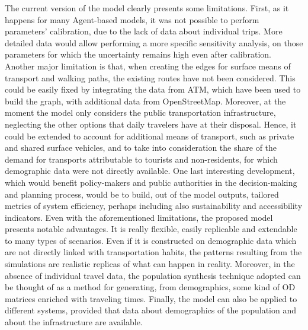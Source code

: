 The current version of the model clearly presents some limitations. First, as it happens for many Agent-based models, it was not possible to perform parameters' calibration, due to the lack of data about individual trips. More detailed data would allow performing a more specific sensitivity analysis, on those parameters for which the uncertainty remains high even after calibration. Another major limitation is that, when creating the edges for surface means of transport and walking paths, the existing routes have not been considered. This could be easily fixed by integrating the data from ATM, which have been used to build the graph, with additional data from OpenStreetMap. Moreover, at the moment the model only considers the public transportation infrastructure, neglecting the other options that daily travelers have at their disposal. Hence, it could be extended to account for additional means of transport, such as private and shared surface vehicles, and to take into consideration the share of the demand for transports attributable to tourists and non-residents, for which demographic data were not directly available. One last interesting development, which would benefit policy-makers and public authorities in the decision-making and planning process, would be to build, out of the model outputs, tailored metrics of system efficiency, perhaps including also sustainability and accessibility indicators.
Even with the aforementioned limitations, the proposed model presents notable advantages. It is really flexible, easily replicable and extendable to many types of scenarios. Even if it is constructed on demographic data which are not directly linked with transportation habits, the patterns resulting from the simulations are realistic replicas of what can happen in reality. Moreover, in the absence of individual travel data, the population synthesis technique adopted can be thought of as a method for generating, from demographics, some kind of OD matrices enriched with traveling times. Finally, the model can also be applied to different systems, provided that data about demographics of the population and about the infrastructure are available. 

